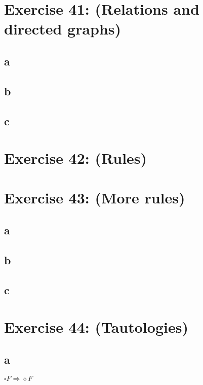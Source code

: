 \documentclass[12pt]{article}
\begin{document}
 

\rhead{\today}


\section*{Exercise 41: (Relations and directed graphs)}

\subsection*{a}

\subsection*{b}

\subsection*{c}

\section*{Exercise 42: (Rules)}

\section*{Exercise 43: (More rules)}

\subsection*{a}

\subsection*{b}

\subsection*{c}

\section*{Exercise 44: (Tautologies)}

\subsection*{a}
$\square F \Rightarrow \diamond F$\\
\end{document}
